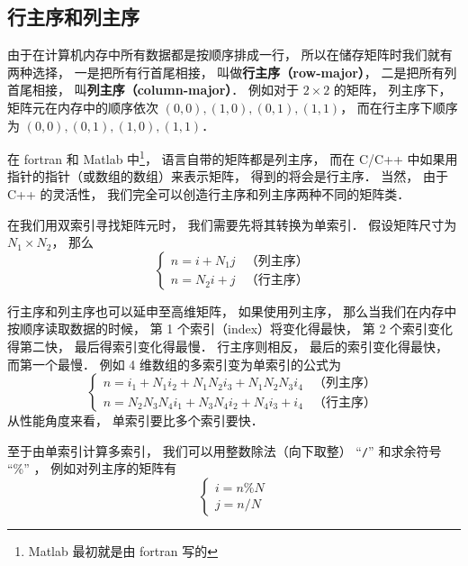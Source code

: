 
\subsection{行主序和列主序}
由于在计算机内存中所有数据都是按顺序排成一行， 所以在储存矩阵时我们就有两种选择， 一是把所有行首尾相接， 叫做\textbf{行主序（row-major）}， 二是把所有列首尾相接， 叫\textbf{列主序（column-major）}． 例如对于 $2 \times 2$ 的矩阵， 列主序下， 矩阵元在内存中的顺序依次 $(0, 0), (1, 0), (0, 1), (1, 1)$， 而在行主序下顺序为 $(0, 0), (0, 1), (1, 0), (1, 1)$．

在 fortran 和 Matlab 中\footnote{Matlab 最初就是由 fortran 写的}， 语言自带的矩阵都是列主序， 而在 C/C++ 中如果用指针的指针（或数组的数组）来表示矩阵， 得到的将会是行主序． 当然， 由于 C++ 的灵活性， 我们完全可以创造行主序和列主序两种不同的矩阵类．

在我们用双索引寻找矩阵元时， 我们需要先将其转换为单索引． 假设矩阵尺寸为 $N_1 \times N_2$， 那么
\begin{equation}
\begin{cases}
n = i + N_1 j  &\text{（列主序）}\\
n = N_2 i + j  &\text{（行主序）}
\end{cases}
\end{equation}

行主序和列主序也可以延申至高维矩阵， 如果使用列主序， 那么当我们在内存中按顺序读取数据的时候， 第 1 个索引（index）将变化得最快， 第 2 个索引变化得第二快， 最后得索引变化得最慢． 行主序则相反， 最后的索引变化得最快， 而第一个最慢． 例如 4 维数组的多索引变为单索引的公式为
\begin{equation}
\begin{cases}
n = i_1 + N_1 i_2 + N_1 N_2 i_3 + N_1 N_2 N_3 i_4  &\text{（列主序）}\\
n = N_2 N_3 N_4 i_1 + N_3 N_4 i_2 + N_4 i_3 + i_4  &\text{（行主序）}
\end{cases}
\end{equation}
从性能角度来看， 单索引要比多个索引要快．

至于由单索引计算多索引， 我们可以用整数除法（向下取整） “\lstinline|/|” 和求余符号 “\%”%
， 例如对列主序的矩阵有
\begin{equation}
\begin{cases}
i = n \% N\\
j = n / N
\end{cases}
\end{equation}
